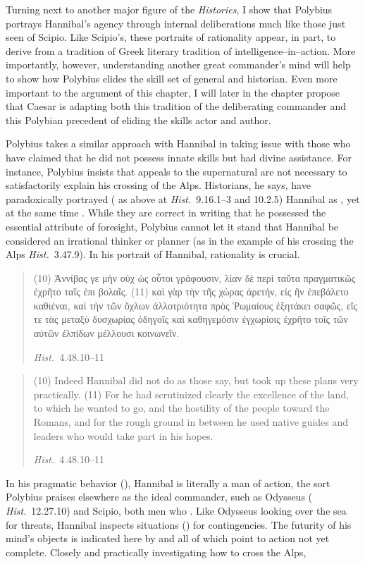 \documentclass[12pt,letterpaper,oneside,final]{memoir}
\begin{document}
Turning next to another major figure of the \emph{Histories}, I show that Polybius portrays Hannibal's agency through internal deliberations much like those just seen of Scipio. Like Scipio's, these portraits of rationality appear, in part, to derive from a tradition of Greek literary tradition of intelligence--in--action. More importantly, however, understanding another great commander's mind will help to show how Polybius elides the skill set of general and historian. Even more important to the argument of this chapter, I will later in the chapter propose that Caesar is adapting both this tradition of the deliberating commander and this Polybian precedent of eliding the skills actor and author.

Polybius takes a similar approach with Hannibal in taking issue with those who have claimed that he did not possess innate skills but had divine assistance. For instance, Polybius insists that appeals to the supernatural are not necessary to satisfactorily explain his crossing of the Alps. Historians, he says, have paradoxically portrayed ( as above at \emph{Hist.}~9.16.1--3 and 10.2.5) Hannibal as , yet at the same time . While they are correct in writing that he possessed the essential attribute of foresight, Polybius cannot let it stand that Hannibal be considered an irrational thinker or planner (as in the example of his crossing the Alps \emph{Hist.}~3.47.9). In his portrait of Hannibal, rationality is crucial. \blockquote[\emph{Hist.}~4.48.10--11]{\textgreek{(10) Ἀννίβας γε μὴν οὐχ ὡς οὗτοι γράφουσιν, λίαν δὲ περὶ ταῦτα πραγματικῶς ἐχρῆτο ταῖς ἐπι βολαῖς. (11) καὶ γὰρ τὴν τῆς χώρας ἀρετήν, εἰς ἣν ἐπεβάλετο καθιέναι, καὶ τὴν τῶν ὄχλων ἀλλοτριότητα πρὸς Ῥωμαίους ἐξητάκει σαφῶς, εἴς τε τὰς μεταξὺ δυσχωρίας ὁδηγοῖς καὶ καθηγεμόσιν ἐγχωρίοις ἐχρῆτο τοῖς τῶν αὐτῶν ἐλπίδων μέλλουσι κοινωνεῖν.}} \blockquote[\emph{Hist.}~4.48.10--11]{(10) Indeed Hannibal did not do as those say, but took up these plans very practically. (11) For he had scrutinized clearly the excellence of the land, to which he wanted to go, and the hostility of the people toward the Romans, and for the rough ground in between he used native guides and leaders who would take part in his hopes.} In his pragmatic behavior (), Hannibal is literally a man of action, the sort Polybius praises elsewhere as the ideal commander, such as Odysseus ( \emph{Hist.}~12.27.10) and Scipio, both men who . Like Odysseus looking over the sea for threats, Hannibal inspects situations () for contingencies. The futurity of his mind's objects is indicated here by   and  all of which point to action not yet complete. Closely and practically investigating how to cross the Alps, 
\end{document}

